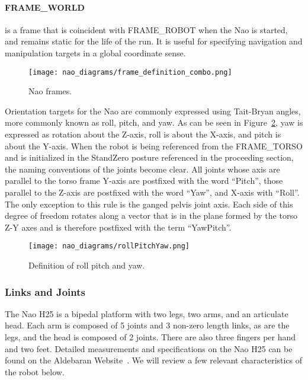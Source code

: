 \paragraph{FRAME\_WORLD}
is a frame that is coincident with FRAME\_ROBOT when the Nao is started,
and remains static for the life of the run. It is useful for specifying navigation
and manipulation targets in a global coordinate sense.

\begin{figure}[H]
\centering
\texttt{[image: nao\_diagrams/frame\_definition\_combo.png]}
\caption{Nao frames.}
\label{fig:nao_frames1}
\end{figure}

Orientation targets for the Nao are commonly expressed using Tait-Bryan angles,
more commonly known as roll, pitch, and yaw. As can be seen in
Figure~\ref{fig:nao_rpy_def1}, yaw is expressed as rotation about the Z-axis,
roll is about the X-axis, and pitch is about the Y-axis.
When the robot is being referenced from the FRAME\_TORSO and is
initialized in the StandZero posture referenced in the proceeding section,
the naming conventions of the joints become clear. All joints whose axis
are parallel to the torso frame Y-axis are postfixed with the word ``Pitch'',
those parallel to the Z-axis are postfixed with the word ``Yaw'', and X-axis
with ``Roll''. The only exception to this rule is the ganged pelvis joint
axis. Each side of this degree of freedom rotates along a vector that is
in the plane formed by the torso Z-Y axes and is therefore postfixed with the
term ``YawPitch''.

\begin{figure}
\centerline{\texttt{[image: nao\_diagrams/rollPitchYaw.png]}
}
\caption{Definition of roll pitch and yaw.}
\label{fig:nao_rpy_def1}
\end{figure}


\subsubsection{Links and Joints}
The Nao H25 is a bipedal platform with two legs, two arms, and an articulate
head. Each arm is composed of 5 joints and 3 non-zero length links, as are 
the legs, and the head is composed of 2 joints. There are also three fingers
per hand and two feet. Detailed measurements and specifications on the
Nao H25 can be found on the Aldebaran Website~\cite{nao_docs_h25}.
We will review a few relevant characteristics of the robot below.

